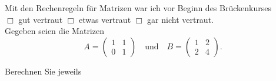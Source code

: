 \documentclass[12pt,answers]{exam}
\begin{document}
\begin{questions}
\begin{parts}
\begin{solution}
\begin{subparts}
\end{subparts}
\end{solution}
\end{parts}
\newpage

Mit den Rechenregeln für Matrizen war ich vor Beginn des Brückenkurses\\ $\Box$ gut vertraut \hfill $\Box$ etwas vertraut \hfill $\Box$ gar nicht vertraut. \\[2ex]
Gegeben seien die Matrizen
\[
A=\left(\begin{array}{rr}1&1\\0&1\end{array}\right)
\textrm{~~~und~~~}
B=\left(\begin{array}{rr}1&2\\2&4\end{array}\right).
\]

Berechnen Sie jeweils\\
\begin{solution}
\end{solution}
\end{questions}
\end{document}
